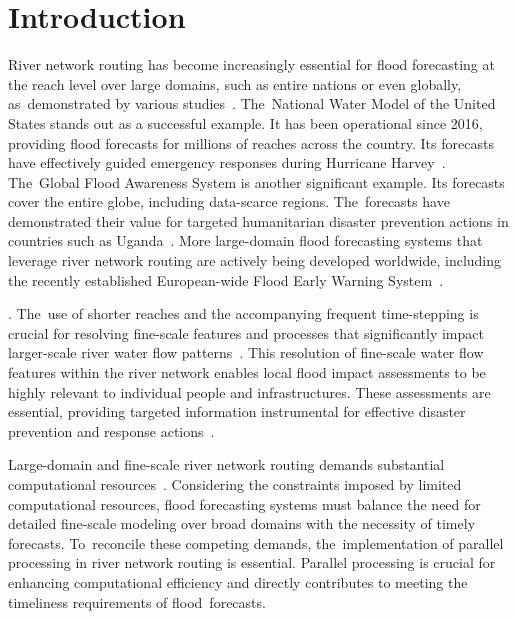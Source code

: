 \documentclass[water,article,accept,pdftex,moreauthors]{Definitions/mdpi}
\begin{document}
\section{Introduction}

River network routing has become increasingly essential for flood forecasting at the reach level over large domains, such as entire nations or even globally, as~demonstrated by various studies~\cite{alfieri2013HESS, david2016ESS, maidment2017JAWRA, lin2018JHM, read2023JAWRA}. The~National Water Model of the United States stands out as a successful example. It has been operational since 2016, providing flood forecasts for millions of reaches across the country. Its forecasts have effectively guided emergency responses during Hurricane Harvey~\cite{maidment2017JAWRA, read2023JAWRA}. The~Global Flood Awareness System is another significant example. Its forecasts cover the entire globe, including data-scarce regions. The~forecasts have demonstrated their value for targeted humanitarian disaster prevention actions in countries such as Uganda~\cite{alfieri2013HESS, coughlan_de_perez2016HESS}. More large-domain flood forecasting systems that leverage river network routing are actively being developed worldwide, including the recently established European-wide Flood Early Warning System~\cite{najafi2024NC, thober2019GMD}.

. The~use of shorter reaches and the accompanying frequent time-stepping is crucial for resolving fine-scale features and processes that significantly impact larger-scale river water flow patterns~\cite{yamazaki2009HESS, thober2019GMD, mizukami2021JAMES, nguyen-quang2018GMD}. This resolution of fine-scale water flow features within the river network enables local flood impact assessments to be highly relevant to individual people and infrastructures. These assessments are essential, providing targeted information instrumental for effective disaster prevention and response actions~\cite{maidment2017JAWRA, coughlan_de_perez2016HESS}.

Large-domain and fine-scale river network routing demands substantial computational resources~\cite{yamazaki2013WRR, liu2014EMS, mizukami2021JAMES, david2015WRR, liu2023JH}. Considering the constraints imposed by limited computational resources, flood forecasting systems must balance the need for detailed fine-scale modeling over broad domains with the necessity of timely forecasts. To~reconcile these competing demands, the~implementation of parallel processing in river network routing is essential. Parallel processing is crucial for enhancing computational efficiency and directly contributes to meeting the timeliness requirements of flood~forecasts.
\end{document}
